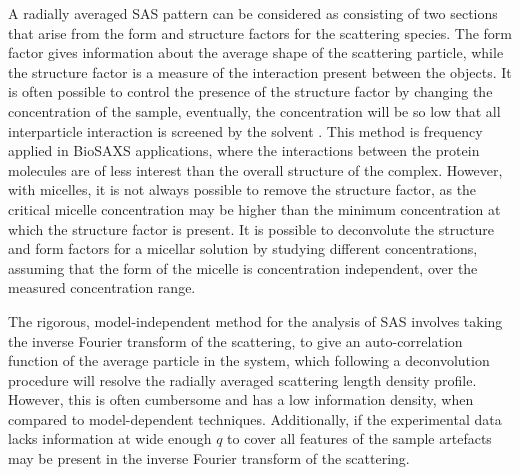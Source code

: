 A radially averaged SAS pattern can be considered as consisting of two sections that arise from the form and structure factors for the scattering species.
The form factor gives information about the average shape of the scattering particle, while the structure factor is a measure of the interaction present between the objects.
It is often possible to control the presence of the structure factor by changing the concentration of the sample, eventually, the concentration will be so low that all interparticle interaction is screened by the solvent \cite{edler_combining_2015}.
This method is frequency applied in BioSAXS applications, where the interactions between the protein molecules are of less interest than the overall structure of the complex.
However, with micelles, it is not always possible to remove the structure factor, as the critical micelle concentration may be higher than the minimum concentration at which the structure factor is present.
It is possible to deconvolute the structure and form factors for a micellar solution by studying different concentrations, assuming that the form of the micelle is concentration independent, over the measured concentration range.

The rigorous, model-independent method for the analysis of SAS involves taking the inverse Fourier transform of the scattering, to give an auto-correlation function of the average particle in the system, which following a deconvolution procedure will resolve the radially averaged scattering length density profile.
However, this is often cumbersome and has a low information density, when compared to model-dependent techniques.
Additionally, if the experimental data lacks information at wide enough $q$ to cover all features of the sample artefacts may be present in the inverse Fourier transform of the scattering.

